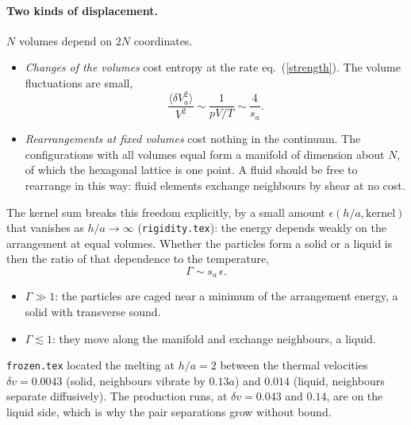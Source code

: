 \documentclass[11pt,aps,preprint,nofootinbib,superscriptaddress,tightenlines]{revtex4-2}
\def\st{\begin{equation}}
\def\stp{\end{equation}}
\def\Eq#1{eq.~(\ref{#1})}
\newcommand{\avg}[1]{\langle #1\rangle}
\let\oldparagraph\paragraph
\renewcommand{\paragraph}{\par\bigskip\oldparagraph}
\begin{document}
\paragraph{Two kinds of displacement.}  $N$ volumes depend on $2N$ coordinates.
\begin{itemize}
\item \emph{Changes of the volumes} cost entropy at the rate \Eq{strength}.  The volume fluctuations are small,
  \st
  \frac{\avg{\delta V_a^2}}{V^2}\sim\frac1{pV/T}\sim\frac4{s_a} .
  \stp
\item \emph{Rearrangements at fixed volumes} cost nothing in the continuum.  The configurations with all volumes equal
  form a manifold of dimension about $N$, of which the hexagonal lattice is one point.  A fluid should be free to
  rearrange in this way: fluid elements exchange neighbours by shear at no cost.
\end{itemize}
The kernel sum breaks this freedom explicitly, by a small amount $\epsilon(h/a,\text{kernel})$ that vanishes as $h/a\to\infty$
(\texttt{rigidity.tex}): the energy depends weakly on the arrangement at equal volumes.  Whether the particles form a
solid or a liquid is then the ratio of that dependence to the temperature,
\st
\Gamma\sim s_a\,\epsilon .
\stp
\begin{itemize}
\item $\Gamma\gg1$: the particles are caged near a minimum of the arrangement energy, a solid with transverse sound.
\item $\Gamma\lesssim1$: they move along the manifold and exchange neighbours, a liquid.
\end{itemize}
\texttt{frozen.tex} located the melting at $h/a=2$ between the thermal velocities $\delta v=0.0043$ (solid, neighbours
vibrate by $0.13a$) and $0.014$ (liquid, neighbours separate diffusively).  The production runs, at $\delta v=0.043$ and
$0.14$, are on the liquid side, which is why the pair separations grow without bound.
\end{document}
